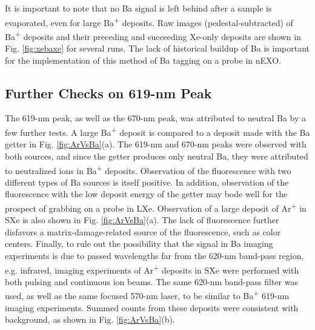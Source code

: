It is important to note that no Ba signal is left behind after a sample is evaporated, even for large Ba\textsuperscript{+} deposits.  Raw images (pedestal-subtracted) of Ba\textsuperscript{+} deposits and their preceding and succeeding Xe-only deposits are shown in Fig. \ref{fig:xebaxe} for several runs.  The lack of historical buildup of Ba is important for the implementation of this method of Ba tagging on a probe in nEXO.

\subsection{Further Checks on 619-nm Peak}
\label{subsec:619identification}

The 619-nm peak, as well as the 670-nm peak, was attributed to neutral Ba by a few further tests.  A large Ba\textsuperscript{+} deposit is compared to a deposit made with the Ba getter in Fig. \ref{fig:ArVsBa}(a).  The 619-nm and 670-nm peaks were observed with both sources, and since the getter produces only neutral Ba, they were attributed to neutralized ions in Ba\textsuperscript{+} deposits.  Observation of the fluorescence with two different types of Ba sources is itself positive.  In addition, observation of the fluorescence with the low deposit energy of the getter may bode well for the prospect of grabbing on a probe in LXe.  Observation of a large deposit of Ar\textsuperscript{+} in SXe is also shown in Fig. \ref{fig:ArVsBa}(a).  The lack of fluorescence further disfavors a matrix-damage-related source of the fluorescence, such as color centers.  Finally, to rule out the possibility that the signal in Ba imaging experiments is due to passed wavelengths far from the 620-nm band-pass region, e.g. infrared, imaging experiments of Ar\textsuperscript{+} deposits in SXe were performed with both pulsing and continuous ion beams.  The same 620-nm band-pass filter was used, as well as the same focused 570-nm laser, to be similar to Ba\textsuperscript{+} 619-nm imaging experiments.  Summed counts from these deposits were consistent with background, as shown in Fig. \ref{fig:ArVsBa}(b).

